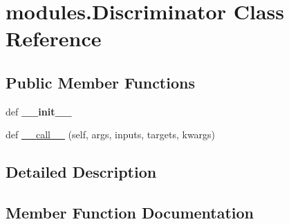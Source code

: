 \hypertarget{classmodules_1_1Discriminator}{}\section{modules.\+Discriminator Class Reference}
\label{classmodules_1_1Discriminator}
\subsection*{Public Member Functions}
\begin{DoxyCompactItemize}
\item 
def {\bfseries \+\_\+\+\_\+init\+\_\+\+\_\+}\hypertarget{classmodules_1_1Discriminator_ae79430af96ad263034049ba01e1e2c8f}{}\label{classmodules_1_1Discriminator_ae79430af96ad263034049ba01e1e2c8f}

\item 
def \hyperlink{classmodules_1_1Discriminator_ad8ff9ec051ea2b440af48108d2e5bfdb}{\+\_\+\+\_\+call\+\_\+\+\_\+} (self, args, inputs, targets, kwargs)
\end{DoxyCompactItemize}


\subsection{Detailed Description}
\begin{DoxyVerb}\end{DoxyVerb}
 

\subsection{Member Function Documentation}
